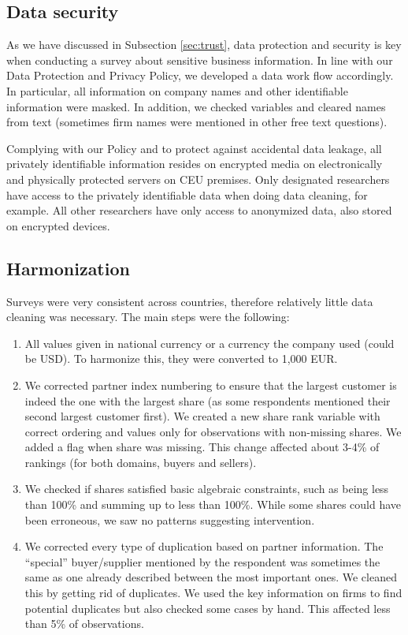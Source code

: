 \documentclass[final, dvipsnames, authoryear,12pt]{elsarticle}
\begin{document}
\subsection{Data security} 

As we have discussed in Subsection \ref{sec:trust}, data protection and security is key when conducting a survey about sensitive business information. In line with our Data Protection and Privacy Policy, we developed a data work flow accordingly. In particular, all information on company names and other identifiable information were masked. In addition, we checked variables and cleared names from text (sometimes firm names were mentioned in other free text questions).

Complying with our Policy and to protect against accidental data leakage, all privately identifiable information resides on encrypted media on electronically and physically protected servers on CEU premises. Only designated researchers have access to the privately identifiable data when doing data cleaning, for example. All other researchers have only access to anonymized data, also stored on encrypted devices.


\subsection{Harmonization} 

Surveys were very consistent across countries, therefore relatively little data cleaning was necessary. The main steps were the following:

\begin{enumerate}
    \item All values given in national currency or a currency the company used (could be USD). To harmonize this, they were converted to 1,000 EUR. 
    
    \item We corrected partner index numbering to ensure that the largest customer is indeed the one with the largest share (as some respondents mentioned their second largest customer first). We created a new share rank variable with correct ordering and values only for observations with non-missing shares. We added a flag when share was missing. This change affected about 3-4\% of rankings (for both domains, buyers and sellers). 
    
    \item We checked if shares satisfied basic algebraic constraints, such as being less than 100\% and summing up to less than 100\%. While some shares could have been erroneous, we saw no patterns suggesting intervention.
    
    \item We corrected every type of duplication based on partner information. The ``special'' buyer/supplier mentioned by the respondent was sometimes the same as one already described between the most important ones. We cleaned this by getting rid of duplicates. We used the key information on firms to find potential duplicates but also checked some cases by hand. This affected less than 5\% of observations.

\end{enumerate}
\end{document}
